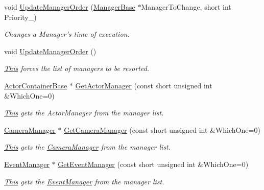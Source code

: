 \begin{DoxyCompactItemize}
void \hyperlink{classphys_1_1World_abbe8ceecc6bdbd542a250fd721c05276}{UpdateManagerOrder} (\hyperlink{classphys_1_1ManagerBase}{ManagerBase} $\ast$ManagerToChange, short int Priority\_\-)
\begin{DoxyCompactList}\small\item\em Changes a Manager's time of execution. \item\end{DoxyCompactList}\item 
void \hyperlink{classphys_1_1World_ae807112b9494a94a6ff0d60df0a4d424}{UpdateManagerOrder} ()
\begin{DoxyCompactList}\small\item\em \hyperlink{structThis}{This} forces the list of managers to be resorted. \item\end{DoxyCompactList}\item 
\hyperlink{classphys_1_1ActorContainerBase}{ActorContainerBase} $\ast$ \hyperlink{classphys_1_1World_a8173d8959802e923f4972822435e43b6}{GetActorManager} (const short unsigned int \&WhichOne=0)
\begin{DoxyCompactList}\small\item\em \hyperlink{structThis}{This} gets the ActorManager from the manager list. \item\end{DoxyCompactList}\item 
\hyperlink{classphys_1_1CameraManager}{CameraManager} $\ast$ \hyperlink{classphys_1_1World_a33ab68866da54b7f8f766d5d29171fb7}{GetCameraManager} (const short unsigned int \&WhichOne=0)
\begin{DoxyCompactList}\small\item\em \hyperlink{structThis}{This} gets the \hyperlink{classphys_1_1CameraManager}{CameraManager} from the manager list. \item\end{DoxyCompactList}\item 
\hyperlink{classphys_1_1EventManager}{EventManager} $\ast$ \hyperlink{classphys_1_1World_ac20a304413b4d47f9ae657983e903a67}{GetEventManager} (const short unsigned int \&WhichOne=0)
\begin{DoxyCompactList}\small\item\em \hyperlink{structThis}{This} gets the \hyperlink{classphys_1_1EventManager}{EventManager} from the manager list. \item\end{DoxyCompactList}\item 

\end{DoxyCompactItemize}
